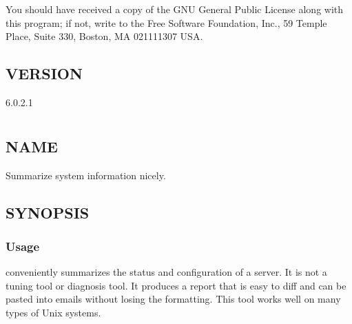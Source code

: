\documentclass[letterpaper,10pt,english]{sphinxmanual}
\begin{document}
You should have received a copy of the GNU General Public License along with
this program; if not, write to the Free Software Foundation, Inc., 59 Temple
Place, Suite 330, Boston, MA  02111\sphinxhyphen{}1307  USA.


\section{VERSION}
\label{\detokenize{mariadb-summary:version}}
 6.0.2.1


\chapter{}
\label{\detokenize{mariadb-system-summary:mariadb-system-summary}}\label{\detokenize{mariadb-system-summary::doc}}

\section{NAME}
\label{\detokenize{mariadb-system-summary:name}}
 \sphinxhyphen{} Summarize system information nicely.


\section{SYNOPSIS}
\label{\detokenize{mariadb-system-summary:synopsis}}

\subsection{Usage}
\label{\detokenize{mariadb-system-summary:usage}}
\begin{sphinxVerbatim}[commandchars=\\\{\}]
\end{sphinxVerbatim}

 conveniently summarizes the status and configuration of
a server. It is not a tuning tool or diagnosis tool.  It produces a report that
is easy to diff and can be pasted into emails without losing the formatting.
This tool works well on many types of Unix systems.
\end{document}

